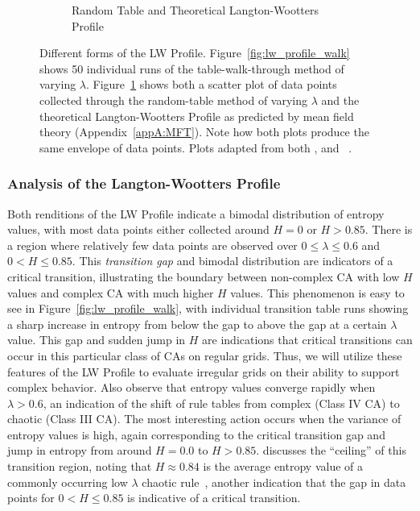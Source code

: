 \documentclass[a4paper,11pt]{article}
\begin{document}
\begin{figure}[htp]
\begin{subfigure}[t]{0.65\textwidth}
  \caption{Random Table and Theoretical Langton-Wootters Profile}
  \label{fig:lw_profile_rand}
  \end{subfigure}
\caption[The Langton-Wootters Profile]{
  Different forms of the LW Profile. Figure~\ref{fig:lw_profile_walk} shows 50 individual runs of the table-walk-through method of varying $\lambda$. Figure~\ref{fig:lw_profile_rand} shows both a scatter plot of data points collected through the random-table method of varying $\lambda$ and the theoretical Langton-Wootters Profile as predicted by mean field theory (Appendix~\ref{appA:MFT}). Note how both plots produce the same envelope of data points. Plots adapted from both \citeauthor{wo90}, and \citeauthor{la90}~\cite{la90,wo90}.
}
\label{fig:lw_profile}
\end{figure}

\subsubsection*{Analysis of the Langton-Wootters Profile}

Both renditions of the LW Profile indicate a bimodal distribution of entropy values, with most data points either collected around $H=0$ or $H > 0.85$. There is a region where relatively few data points are observed over $0 \le \lambda \le 0.6$ and $0 < H \le 0.85$. This \textit{transition gap} and bimodal distribution are indicators of a critical transition, illustrating the boundary between non-complex CA with low $H$ values and complex CA with much higher $H$ values. This phenomenon is easy to see in Figure~\ref{fig:lw_profile_walk}, with individual transition table runs showing a sharp increase in entropy from below the gap to above the gap at a certain $\lambda$ value. This gap and sudden jump in $H$ are indications that critical transitions can occur in this particular class of CAs on regular grids. Thus, we will utilize these features of the LW Profile to evaluate irregular grids on their ability to support complex behavior.
Also observe that entropy values converge rapidly when $\lambda > 0.6$, an indication of the shift of rule tables from complex (Class IV CA) to chaotic (Class III CA). The most interesting action occurs when the variance of entropy values is high, again corresponding to the critical transition gap and jump in entropy from around $H=0.0$ to $H > 0.85$. \citeauthor{la90} discusses the ``ceiling'' of this transition region, noting that $H \approx 0.84$ is the average entropy value of a commonly occurring low $\lambda$ chaotic rule~\cite{la90}, another indication that the gap in data points for $0 < H \le 0.85$ is indicative of a critical transition.
\end{document}
